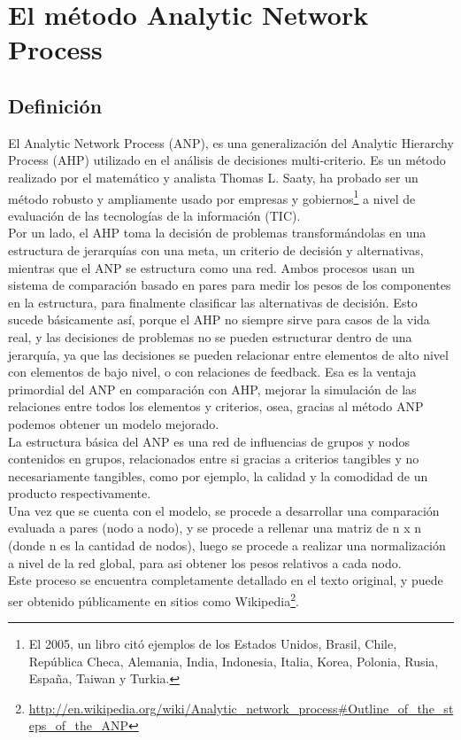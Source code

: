 \documentclass[12pt,letterpaper]{article}
\begin{document}
\section{El método Analytic Network Process}
\subsection{Definición}
El Analytic Network Process (ANP), es una generalización del Analytic
Hierarchy Process (AHP) utilizado en el análisis de decisiones multi-criterio. Es un método realizado por el matemático y analista Thomas L. Saaty, ha probado ser un método robusto y ampliamente usado por empresas y gobiernos\footnote{El 2005, un libro citó ejemplos de los Estados Unidos, Brasil, Chile, República Checa, Alemania, India, Indonesia, Italia, Korea, Polonia, Rusia, España, Taiwan y Turkia.} a nivel de evaluación de las tecnologías de la información (TIC).\\

Por un lado, el AHP toma la decisión de problemas transformándolas en una estructura
de jerarquías con una meta, un criterio de decisión y alternativas, mientras que el ANP se estructura como una red. Ambos procesos usan un sistema de comparación basado en pares para medir los pesos de los componentes en la estructura, para finalmente clasificar las alternativas de decisión. Esto sucede básicamente así, porque el AHP no siempre sirve para casos de la vida real, y las decisiones de problemas no se pueden estructurar dentro de una jerarquía, ya que las decisiones se pueden relacionar entre elementos de alto nivel con elementos de bajo nivel, o con relaciones de feedback. Esa es la ventaja primordial del ANP en comparación con AHP, mejorar la simulación de las relaciones entre todos los elementos y criterios, osea, gracias al método ANP podemos obtener un modelo mejorado.\\

La estructura básica del ANP es una red de influencias de grupos y nodos contenidos en grupos, relacionados entre si gracias a criterios tangibles y no necesariamente tangibles, como por ejemplo, la calidad y la comodidad de un producto respectivamente.\\
\indent Una vez que se cuenta con el modelo, se procede a desarrollar una comparación evaluada a pares (nodo a nodo), y se procede a rellenar una matriz de n x n (donde n es la cantidad de nodos), luego se procede a realizar una normalización a nivel de la red global, para asi obtener los pesos relativos a cada nodo.\\
\indent Este proceso se encuentra completamente detallado en el texto original, y puede ser obtenido públicamente en sitios como Wikipedia\footnote{\url{http://en.wikipedia.org/wiki/Analytic_network_process\#Outline_of_the_steps_of_the_ANP}}.
\newpage
\end{document}
